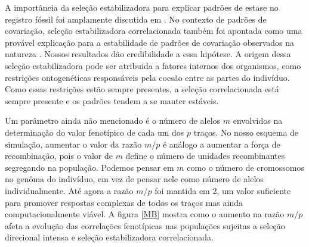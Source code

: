 A importância da seleção estabilizadora para explicar padrões de estase
no registro fóssil foi amplamente discutida em \cite{Charlesworth1982a}.
No contexto de padrões de covariação, seleção estabilizadora
correlacionada também foi apontada como uma provável explicação para a
estabilidade de padrões de covariação observados na natureza
\citep{Cheverud1984, Marroig2001, Porto2008}. 
Nossos resultados dão credibilidade a essa hipótese. 
A origem dessa seleção estabilizadora pode ser atribuida a fatores
internos dos organismos, como restrições ontogenéticas responsáveis pela
coesão entre as partes do indivíduo. 
Como essas restrições estão sempre presentes, a seleção correlacionada
está sempre presente e os padrões tendem a se manter estáveis. 

Um parâmetro ainda não mencionado é o número de alelos $m$ envolvidos na
determinação do valor fenotípico de cada um dos $p$ traços. 
No nosso esquema de simulação, aumentar o valor da razão $m/p$ é análogo
a aumentar a força de recombinação, pois o valor de $m$ define o número
de unidades recombinantes segregando na população. 
Podemos pensar em $m$ como o número de cromossomos no genôma do
indivíduo, em vez de pensar nele como número de alelos individualmente. 
Até agora a razão $m/p$ foi mantida em 2, um valor suficiente para
promover respostas complexas de todos os traços mas ainda
computacionalmente viável. 
A figura \ref{MB} mostra como o aumento na razão $m/p$ afeta a evolução
das correlações fenotípicas nas populações sujeitas a seleção direcional
intensa e seleção estabilizadora correlacionada. 

